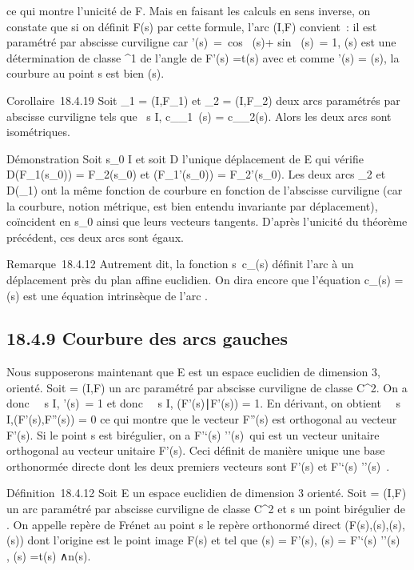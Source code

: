 \documentclass[]{article}
\begin{document}
ce qui montre l'unicité de F. Mais en faisant les calculs en sens
inverse, on constate que si on définit F(s) par cette formule, l'arc
(I,F) convient~: il est paramétré par abscisse curviligne car
\F'(s)\
=\ cos~
\phi(s)\vec\imath + sin~
\phi(s)\ = 1, \phi(s) est une
détermination de classe ^1 de l'angle de F'(s)
=\vec t(s) avec \vec\imath et comme
\phi'(s) = \gamma(s), la courbure au point s est bien \gamma(s).

Corollaire~18.4.19 Soit \Gamma_1 = (I,F_1) et \Gamma_2
= (I,F_2) deux arcs paramétrés par abscisse curviligne tels que
\forall~s \in I, c_\Gamma_1~(s) =
c_\Gamma_2(s). Alors les deux arcs sont isométriques.

Démonstration Soit s_0 \in I et soit D l'unique déplacement de E
qui vérifie D(F_1(s_0)) = F_2(s_0)
et \overrightarrowD(F_1'(s_0)) =
F_2'(s_0). Les deux arcs \Gamma_2 et
D(\Gamma_1) ont la même fonction de courbure en fonction de
l'abscisse curviligne (car la courbure, notion métrique, est bien
entendu invariante par déplacement), coïncident en s_0 ainsi
que leurs vecteurs tangents. D'après l'unicité du théorème précédent,
ces deux arcs sont égaux.

Remarque~18.4.12 Autrement dit, la fonction
s\mapsto~c_\Gamma(s) définit l'arc \Gamma à un
déplacement près du plan affine euclidien. On dira encore que l'équation
c_\Gamma(s) = \gamma(s) est une équation intrinsèque de l'arc \Gamma.

\subsection{18.4.9 Courbure des arcs gauches}

Nous supposerons maintenant que E est un espace euclidien de dimension
3, orienté. Soit \Gamma = (I,F) un arc paramétré par abscisse curviligne de
classe C^2. On a donc \forall~~s \in I,
\F'(s)\ = 1 et donc
\forall~~s \in I,
(F'(s)∣F'(s)) = 1. En dérivant, on obtient
\forall~~s \in I,(F'(s),F''(s)) = 0 ce qui montre que le
vecteur F''(s) est orthogonal au vecteur F'(s). Si le point s est
birégulier, on a  F'`(s) \over
\F''(s)\ qui est un
vecteur unitaire orthogonal au vecteur unitaire F'(s). Ceci définit de
manière unique une base orthonormée directe dont les deux premiers
vecteurs sont F'(s) et  F'`(s) \over
\F''(s)\ .

Définition~18.4.12 Soit E un espace euclidien de dimension 3 orienté.
Soit \Gamma = (I,F) un arc paramétré par abscisse curviligne de classe
C^2 et s un point birégulier de \Gamma. On appelle repère de
Frénet au point s le repère orthonormé direct
(F(s),\vect(s),\vecn(s),\vecb(s))
dont l'origine est le point image F(s) et tel que
\vect(s) = F'(s), \vecn(s) =
F'`(s) \over
\F''(s)\\
, \vecb(s) =\vec t(s)
∧\vec n(s).
\end{document}

